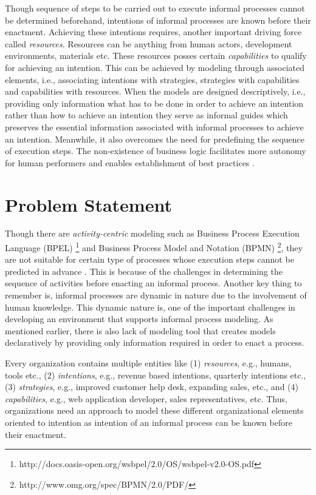 Though sequence of steps to be carried out to execute informal processes cannot be determined beforehand, intentions of informal processes are known before their enactment. Achieving these intentions requires, another important driving force called \textit{resources}. Resources can be anything from human actors, development environments, materials etc. These resources posses certain \textit{capabilities} to qualify for achieving an intention. This can be achieved by modeling through associated elements, i.e., associating intentions with strategies, strategies with capabilities and capabilities with resources. When the models are designed descriptively, i.e., providing only information what has to be done in order to achieve an intention rather than how to achieve an intention they serve as informal guides which preserves the essential information associated with informal processes to achieve an intention. Meanwhile, it also overcomes the need for predefining the sequence of execution steps. The non-existence of business logic facilitates more autonomy for human performers and enables establishment of best practices \cite{Sungur2014a}.

\section{Problem Statement}
\label{sec:problemstatement}
Though there are \textit{activity-centric} modeling such as Business Process Execution Language (BPEL) \footnote{http://docs.oasis-open.org/wsbpel/2.0/OS/wsbpel-v2.0-OS.pdf} and Business Process Model and Notation (BPMN) \footnote{http://www.omg.org/spec/BPMN/2.0/PDF/}, they are not suitable for certain type of processes whose execution steps cannot be predicted in advance \cite{Sungur2014a}. This is because of the challenges in determining the sequence of activities before enacting an informal process. Another key thing to remember is, informal processes are dynamic in nature due to the involvement of human knowledge. This dynamic nature is, one of the important challenges in developing an environment that supports informal process modeling. As mentioned earlier, there is also lack of modeling tool that creates models declaratively by providing only information required in order to enact a process. 

Every organization contains multiple entities like (1) \textit{resources}, e.g., humans, tools etc., (2) \textit{intentions}, e.g., revenue based intentions, quarterly intentions etc., (3) \textit{strategies}, e.g., improved customer help desk, expanding sales, etc., and (4) \textit{capabilities}, e.g., web application developer, sales representatives, etc. Thus, organizations need an approach to model these different organizational elements oriented to intention as intention of an informal process can be known before their enactment.

